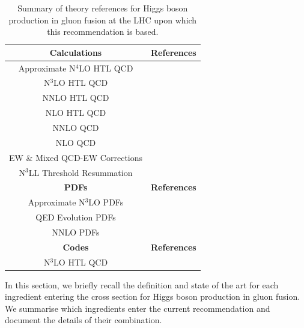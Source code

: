 \begin{table}[h!]
\centering
\begin{tabular}{c|c}
\hline
\textbf{Calculations} & \textbf{References} \\ 
\hline
Approximate N$^4$LO HTL QCD & \cite{Das:2020adl} \\
N$^3$LO HTL QCD   & \cite{Anastasiou:2015vya,Anastasiou:2016cez,Mistlberger:2018etf} \\
NNLO HTL QCD   & \cite{Anastasiou:2002yz,Harlander:2002wh,Ravindran:2003um} \\
NLO HTL QCD   & \cite{Dawson:1990zj,Djouadi:1991tka} \\
NNLO QCD & \cite{Czakon:2020vql,Czakon:2021yub,Czakon:2023kqm,Czakon:2024ywb}\\
NLO QCD & \cite{Graudenz:1992pv,Spira:1995rr} \\
EW \& Mixed QCD-EW Corrections & \cite{Actis:2008ts,Actis:2008ug,Aglietti:2004nj,Becchetti:2020wof} \\
N$^3$LL Threshold Resummation & \cite{Anastasiou:2016cez,Bonvini:2014joa,Catani:2014uta} \\
\hline
\textbf{PDFs} & \textbf{References} \\
\hline
Approximate N$^3$LO PDFs & \cite{Cridge:2024icl,McGowan:2022nag,NNPDF:2024nan,Cooper-Sarkar:2024crx} \\
QED Evolution PDFs & \cite{Manohar:2016nzj,Manohar:2017eqh,Bertone:2017bme,Harland-Lang:2019pla,Xie:2021equ,Cridge:2021pxm,Cridge:2023ryv,Barontini:2024dyb,NNPDF:2024djq} \\
NNLO PDFs & \cite{PDF4LHCWorkingGroup:2022cjn,Hou:2019efy,Bailey:2020ooq,Alekhin:2017kpj,NNPDF:2017mvq}\\
\hline
\textbf{Codes} & \textbf{References} \\ 
\hline
N$^3$LO HTL QCD & \cite{Dulat:2018rbf}
\end{tabular}
\caption{Summary of theory references for Higgs boson production in gluon fusion at the LHC upon which this recommendation is based.
}
\label{tab:ggf_cite}
\end{table}

In this section, we briefly recall the definition and state of the art for each ingredient entering the cross section for Higgs boson production in gluon fusion.
We summarise which ingredients enter the current recommendation and document the details of their combination.

